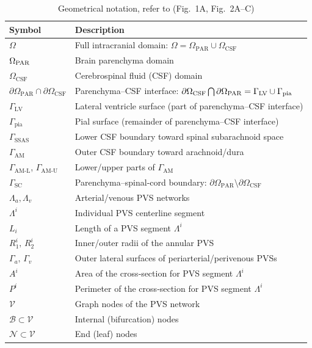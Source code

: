 \documentclass[fleqn,10pt]{wlscirep}
\begin{document}
\begin{table}[h!] 
\centering
\begin{tabular}{ll}
\toprule
\textbf{Symbol} & \textbf{Description} \\
\midrule
$\Omega$ & Full intracranial domain: $\Omega = \Omega_{\mathrm{PAR}} \cup \Omega_{\mathrm{CSF}}$ \\
$\Omega_{\rm PAR}$ & Brain parenchyma domain \\
$\Omega_{\mathrm{CSF}}$ & Cerebrospinal fluid (CSF) domain \\
$\partial\Omega_{\mathrm{PAR}}\cap\partial\Omega_{\mathrm{CSF}}$ & Parenchyma–CSF interface: $\partial \Omega_{\rm CSF} \bigcap \partial
\Omega_{\rm PAR} = \Gamma_{\rm LV} \cup \Gamma_{\rm pia}$ \\
$\Gamma_{\mathrm{LV}}$ & Lateral ventricle surface (part of parenchyma–CSF interface) \\
$\Gamma_{\mathrm{pia}}$ & Pial surface (remainder of parenchyma–CSF interface) \\
$\Gamma_{\mathrm{SSAS}}$ & Lower CSF boundary toward spinal subarachnoid space \\
$\Gamma_{\mathrm{AM}}$ & Outer CSF boundary toward arachnoid/dura \\
$\Gamma_{\mathrm{AM\text{-}L}}$, $\Gamma_{\mathrm{AM\text{-}U}}$ & Lower/upper parts of $\Gamma_{\mathrm{AM}}$ \\
$\Gamma_{\mathrm{SC}}$ & Parenchyma–spinal‐cord boundary: $\partial\Omega_{\mathrm{PAR}}\setminus\partial\Omega_{\mathrm{CSF}}$ \\
$\Lambda_{a},\Lambda_{v}$ & Arterial/venous PVS networks \\
$\Lambda^{i}$ & Individual PVS centerline segment \\
$L_i$ & Length of a PVS segment $\Lambda^i$ \\
$R_{1}^{i},\,R_{2}^{i}$ & Inner/outer radii of the annular PVS \\
$\Gamma_{a},\,\Gamma_{v}$ & Outer lateral surfaces of periarterial/perivenous PVSs \\
$A^i$ & Area of the cross‐section for PVS segment $\Lambda^i$ \\
$P^i$ & Perimeter of the cross‐section for PVS segment $\Lambda^i$ \\
$\mathcal V$ & Graph nodes of the PVS network \\
$\mathcal B\subset  \mathcal V$ & Internal (bifurcation) nodes \\
$\mathcal N\subset  \mathcal V$ & End (leaf) nodes \\
\bottomrule
\end{tabular}
\caption{Geometrical notation, refer to (Fig.~1A, Fig.~2A--C)}
\label{table:geometry_notation}
\end{table}
\end{document}
